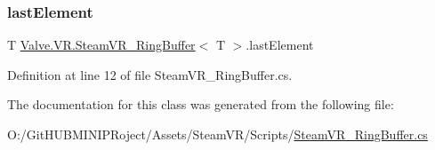 \subsubsection{\texorpdfstring{lastElement}{lastElement}}
{\footnotesize\ttfamily T \mbox{\hyperlink{class_valve_1_1_v_r_1_1_steam_v_r___ring_buffer}{Valve.\+V\+R.\+Steam\+V\+R\+\_\+\+Ring\+Buffer}}$<$ T $>$.last\+Element\hspace{0.3cm}{\ttfamily [protected]}}



Definition at line 12 of file Steam\+V\+R\+\_\+\+Ring\+Buffer.\+cs.



The documentation for this class was generated from the following file\+:\begin{DoxyCompactItemize}
\item 
O\+:/\+Git\+H\+U\+B\+M\+I\+N\+I\+P\+Roject/\+Assets/\+Steam\+V\+R/\+Scripts/\mbox{\hyperlink{_steam_v_r___ring_buffer_8cs}{Steam\+V\+R\+\_\+\+Ring\+Buffer.\+cs}}\end{DoxyCompactItemize}
